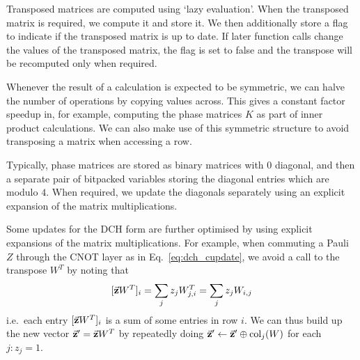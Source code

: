 Transposed matrices are computed using `lazy evaluation'. When the transposed matrix is required, we compute it and store it. We then additionally store a flag to indicate if the transposed matrix is up to date. If later function calls change the values of the transposed matrix, the flag is set to false and the transpose will be recomputed only when required.\par
Whenever the result of a calculation is expected to be symmetric, we can halve the number of operations by copying values across. This gives a constant factor speedup in, for example, computing the phase matrices $K$ as part of inner product calculations. We can also make use of this symmetric structure to avoid transposing a matrix when accessing a row.\par
Typically, phase matrices are stored as binary matrices with $0$ diagonal, and then a separate pair of bitpacked variables storing the diagonal entries which are modulo $4$. When required, we update the diagonals separately using an explicit expansion of the matrix multiplications.\par
Some updates for the DCH form are further optimised by using explicit expansions of the matrix multiplications. For example, when commuting a Pauli $Z$ through the CNOT layer as in Eq.~\ref{eq:dch_cupdate}, we avoid a call to the transpose $W^{T}$ by noting that
\[[\va{z}W^{T}]_{i} = \sum_{j}z_{j}W^{T}_{j,i}=\sum_{j}z_{j}W_{i,j} \]
i.e.\ each entry $[\va{z}W^{T}]_{i}$ is a sum of some entries in row $i$. We can thus build up the new vector $\va{z}'=\va{z}W^{T}$ by repeatedly doing $\va{z}'\gets \va{z}' \oplus \text{col}_{j}(W)$ for each $j:z_{j}=1$.
